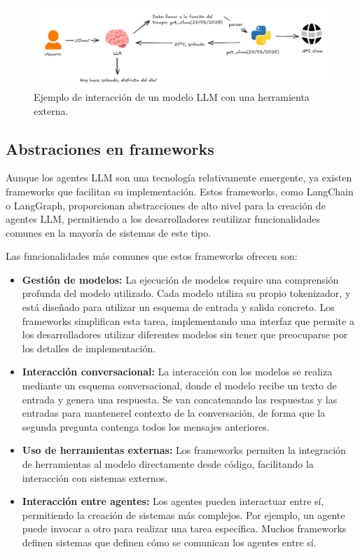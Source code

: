 \begin{figure}
  \centering
  \includegraphics[width=1\linewidth]{figures/herramienta.png}
  \caption{Ejemplo de interacción de un modelo LLM con una herramienta externa.}
  \label{fig:herramientas}
\end{figure}

\subsection{Abstraciones en frameworks}
Aunque los agentes LLM son una tecnología relativamente emergente, ya existen frameworks que facilitan su implementación. Estos frameworks, como LangChain o LangGraph, proporcionan abstracciones de alto nivel para la creación de agentes LLM, permitiendo a los desarrolladores reutilizar funcionalidades comunes en la mayoría de sistemas de este tipo. 

Las funcionalidades más comunes que estos frameworks ofrecen son: 
\begin{itemize}
  \item {\textbf{Gestión de modelos:}} La ejecución de modelos require una comprensión profunda del modelo utilizado. Cada modelo utiliza su propio tokenizador, y está diseñado para utilizar un esquema de entrada y salida concreto. Los frameworks simplifican esta tarea, implementando una interfaz que permite a los desarrolladores utilizar diferentes modelos sin tener que preocuparse por los detalles de implementación. 
  \item {\textbf{Interacción conversacional:}} La interacción con los modelos se realiza mediante un esquema conversacional, donde el modelo recibe un texto de entrada y genera una respuesta. Se van concatenando las respuestas y las entradas para mantenerel contexto de la conversación, de forma que la segunda pregunta contenga todos los mensajes anteriores.
  \item {\textbf{Uso de herramientas externas:}} Los frameworks permiten la integración de herramientas al modelo directamente desde código, facilitando la interacción con sistemas externos.
  \item {\textbf{Interacción entre agentes:}} Los agentes pueden interactuar entre sí, permitiendo la creación de sistemas más complejos. Por ejemplo, un agente puede invocar a otro para realizar una tarea específica. Muchos frameworks definen sistemas que definen cómo se comunican los agentes entre sí. 
\end{itemize}










